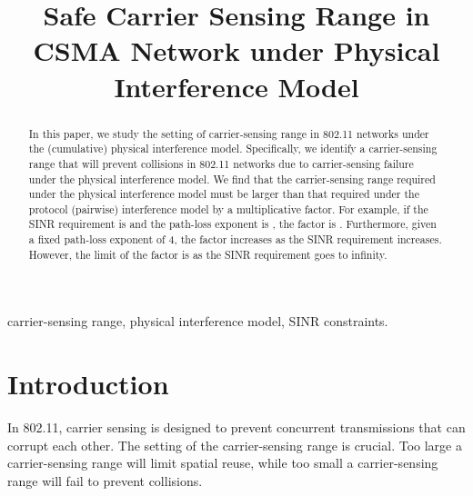 \documentclass[conference]{IEEEtran}
\begin{document}
\title{Safe Carrier Sensing Range in CSMA Network under Physical Interference Model}

\author{

}

\maketitle

\begin{abstract}

In this paper, we study the setting of carrier-sensing range in
802.11 networks under the (cumulative) physical interference model.
Specif\/ically, we identify a carrier-sensing range that will
prevent collisions in 802.11 networks due to carrier-sensing failure
under the physical interference model. We f\/ind that the
carrier-sensing range required under the physical interference model
must be larger than that required under the protocol (pairwise)
interference model by a multiplicative factor. For example, if the
SINR requirement is  and the path-loss exponent is , the
factor is . Furthermore, given a fixed path-loss exponent of 4,
the factor increases as the SINR requirement increases. However, the
limit of the factor is  as the SINR requirement goes to
infinity.
\end{abstract}

\begin{keywords}
carrier-sensing range, physical interference model, SINR
constraints.
\end{keywords}


\IEEEpeerreviewmaketitle

\section{Introduction}

In 802.11, carrier sensing is designed to prevent concurrent
transmissions that can corrupt each other. The setting of the
carrier-sensing range is crucial. Too large a carrier-sensing range
will limit spatial reuse, while too small a carrier-sensing range
will fail to prevent collisions.
\end{document}
